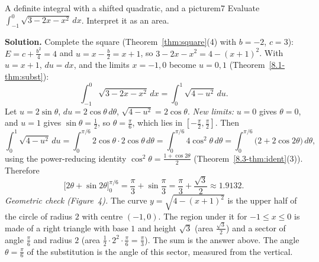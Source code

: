 \documentclass[11pt]{article}
\begin{document}
\begin{exmp}{A definite integral with a shifted quadratic, and a picture}{m7}
Evaluate $\displaystyle\int_{-1}^0\sqrt{3-2x-x^2}\,dx$. Interpret it as an area.

\textbf{Solution.} Complete the square (Theorem~\ref{thm:square}(4) with $b=-2$, $c=3$): $E=c+\frac{b^2}4=4$ and $u=x-\frac b2=x+1$, so $3-2x-x^2=4-(x+1)^2$. With $u=x+1$, $du=dx$, and the limits $x=-1,0$ become $u=0,1$ (Theorem~\ref{8.1-thm:subst}):
\[\int_{-1}^0\sqrt{3-2x-x^2}\,dx=\int_0^1\sqrt{4-u^2}\,du .\]
Let $u=2\sin\theta$, $du=2\cos\theta\,d\theta$, $\sqrt{4-u^2}=2\cos\theta$. \emph{New limits:} $u=0$ gives $\theta=0$, and $u=1$ gives $\sin\theta=\frac12$, so $\theta=\frac\pi6$, which lies in $\left[-\frac\pi2,\frac\pi2\right]$. Then
\[\int_0^1\sqrt{4-u^2}\,du=\int_0^{\pi/6}2\cos\theta\cdot2\cos\theta\,d\theta=\int_0^{\pi/6}4\cos^2\theta\,d\theta=\int_0^{\pi/6}\big(2+2\cos2\theta\big)\,d\theta ,\]
using the power-reducing identity $\cos^2\theta=\frac{1+\cos2\theta}2$ (Theorem~\ref{8.3-thm:ident}(3)). Therefore
\[\Big[2\theta+\sin2\theta\Big]_0^{\pi/6}=\frac\pi3+\sin\frac\pi3=\frac\pi3+\frac{\sqrt3}2\approx1.9132 .\]
\emph{Geometric check (Figure~4).} The curve $y=\sqrt{4-(x+1)^2}$ is the upper half of the circle of radius $2$ with centre $(-1,0)$. The region under it for $-1\le x\le0$ is made of a right triangle with base $1$ and height $\sqrt3$ (area $\frac{\sqrt3}2$) and a sector of angle $\frac\pi6$ and radius $2$ (area $\frac12\cdot2^2\cdot\frac\pi6=\frac\pi3$). The sum is the answer above. The angle $\theta=\frac\pi6$ of the substitution is the angle of this sector, measured from the vertical.


\end{exmp}
\end{document}
